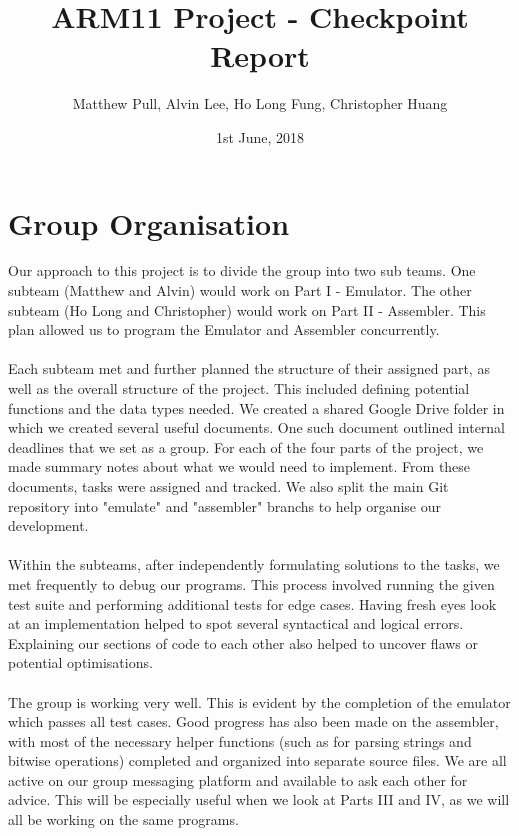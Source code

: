 \documentclass[11pt,twoside]{article}
\title{ARM11 Project - Checkpoint Report}
\date{1st June, 2018}
\author{Matthew Pull, Alvin Lee, Ho Long Fung, Christopher Huang}
\begin{document}
\maketitle



\section{Group Organisation}
Our approach to this project is to divide the group into two sub teams. One subteam (Matthew and Alvin) would work on Part I - Emulator. The other subteam (Ho Long and Christopher) would work on Part II - Assembler. This plan allowed us to program the Emulator and Assembler concurrently.
\\\\
Each subteam met and further planned the structure of their assigned part, as well as the overall structure of the project. This included defining potential functions and the data types needed. We created a shared Google Drive folder in which we created several useful documents. One such document outlined internal deadlines that we set as a group. For each of the four parts of the project, we made summary notes about what we would need to implement. From these documents, tasks were assigned and tracked. We also split the main Git repository into "emulate" and "assembler" branchs to help organise our development.
\\\\
Within the subteams, after independently formulating solutions to the tasks, we met frequently to debug our programs. This process involved running the given test suite and performing additional tests for edge cases. Having fresh eyes look at an implementation helped to spot several syntactical and logical errors. Explaining our sections of code to each other also helped to uncover flaws or potential optimisations.  
\\\\
The group is working very well. This is evident by the completion of the emulator which passes all test cases. Good progress has also been made on the assembler, with most of the necessary helper functions (such as for parsing strings and bitwise operations) completed and organized into separate source files. We are all active on our group messaging platform and available to ask each other for advice. This will be especially useful when we look at Parts III and IV, as we will all be working on the same programs. 
\end{document}
